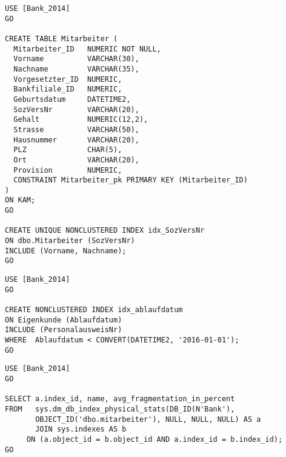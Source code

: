\begin{enumerate}
        
        \begin{lstlisting}[language=ms_sql]
USE [Bank_2014]
GO

CREATE TABLE Mitarbeiter (
  Mitarbeiter_ID   NUMERIC NOT NULL,
  Vorname          VARCHAR(30),
  Nachname         VARCHAR(35),
  Vorgesetzter_ID  NUMERIC,
  Bankfiliale_ID   NUMERIC,
  Geburtsdatum     DATETIME2,
  SozVersNr        VARCHAR(20),
  Gehalt           NUMERIC(12,2),
  Strasse          VARCHAR(50),
  Hausnummer       VARCHAR(20),
  PLZ              CHAR(5),
  Ort              VARCHAR(20),
  Provision        NUMERIC,
  CONSTRAINT Mitarbeiter_pk PRIMARY KEY (Mitarbeiter_ID)
)
ON KAM;
GO

CREATE UNIQUE NONCLUSTERED INDEX idx_SozVersNr
ON dbo.Mitarbeiter (SozVersNr)
INCLUDE (Vorname, Nachname);
GO
        \end{lstlisting}

        
        \begin{lstlisting}[language=ms_sql]
USE [Bank_2014]
GO

CREATE NONCLUSTERED INDEX idx_ablaufdatum
ON Eigenkunde (Ablaufdatum)
INCLUDE (PersonalausweisNr)
WHERE  Ablaufdatum < CONVERT(DATETIME2, '2016-01-01');
GO
        \end{lstlisting}
\clearpage
        
        \begin{lstlisting}[language=ms_sql]
USE [Bank_2014]
GO

SELECT a.index_id, name, avg_fragmentation_in_percent
FROM   sys.dm_db_index_physical_stats(DB_ID(N'Bank'), 
       OBJECT_ID('dbo.mitarbeiter'), NULL, NULL, NULL) AS a
       JOIN sys.indexes AS b
     ON (a.object_id = b.object_id AND a.index_id = b.index_id);
GO


\end{lstlisting}
\end{enumerate}
